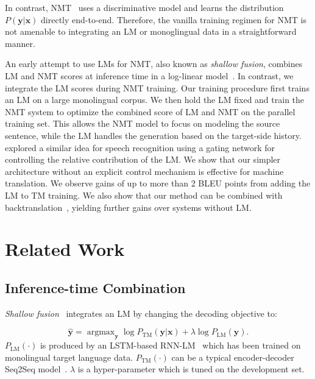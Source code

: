 \documentclass[11pt,a4paper]{article}
\DeclareMathOperator*{\argmax}{argmax}
\begin{document}
In contrast, NMT~\citep{sutskever,bahdanau} uses a discriminative model and learns the distribution  $P(\mathbf{y}|\mathbf{x})$ directly end-to-end. Therefore, the vanilla training regimen for NMT is not amenable to integrating an LM or monoglingual data in a straightforward manner.

An early attempt to use LMs for NMT, also known as {\em shallow fusion}, combines LM and NMT scores at inference time in a log-linear model~\citep{deepfusion,deepfusion-csl}. In contrast, we integrate the LM scores during NMT training. Our training procedure first trains an LM on a large monolingual corpus. We then hold the LM fixed and train the NMT system to optimize the combined score of LM and NMT on the parallel training set. This allows the NMT model to focus on modeling the source sentence, while the LM handles the generation based on the target-side history. \citet{coldfusion} explored a similar idea for speech recognition using a gating network for controlling the relative contribution of the LM. We show that our simpler architecture without an explicit control mechanism is effective for machine translation. We observe gains of up to more than 2 BLEU points from adding the LM to TM training. We also show that our method can be combined with backtranslation~\citep{backtranslation}, yielding further gains over systems without LM. 

\section{Related Work}

\subsection{Inference-time Combination}
\label{sec:shallow-fusion}

{\em Shallow fusion}~\citep{deepfusion} integrates an LM by changing the decoding objective to:

\begin{equation}
\hat{\mathbf{y}} = \argmax_\mathbf{y} \log P_\text{TM}(\mathbf{y}|\mathbf{x}) + \lambda\log P_\text{LM}(\mathbf{y}).
\label{eq:shallow-fusion}
\end{equation}
$P_\text{LM}(\cdot)$ is produced by an LSTM-based RNN-LM~\citep{rnnlm} which has been trained on monolingual target language data. $P_\text{TM}(\cdot)$ can be a typical encoder-decoder Seq2Seq model~\citep{sutskever,bahdanau,dot-attn}. $\lambda$ is a hyper-parameter which is tuned on the development set.
\end{document}
